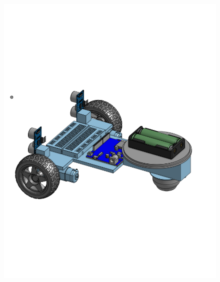 \documentclass[a4paper,12pt]{article}
\begin{document}
\begin{center}\begin{figure}[H]\centering\includegraphics[height=0.45\textheight]{./model_images/a2.png}\end{figure}\FloatBarrier\end{center}
\end{document}
